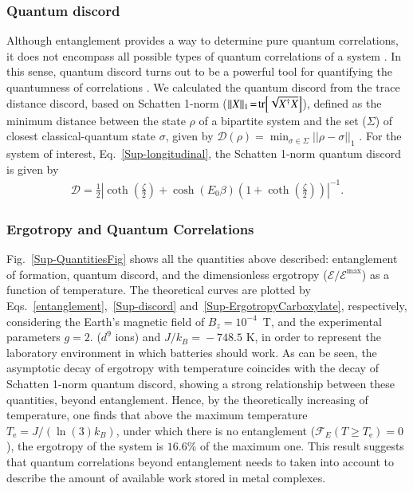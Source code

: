 \documentclass[aps,prl,epsfigure,twocolumn,superscriptaddress]{revtex4-1}
\newcommand{\Dcal}{\mathcal{D}}
\newcommand{\Ecal}{\mathcal{E}}
\newcommand{\Fcal}{\mathcal{F}}
\newcommand{\1}{\mathbbm{1}}
\begin{document}
\subsubsection{Quantum discord}

Although entanglement provides a way to determine pure quantum correlations, it does not encompass all possible types of quantum correlations of a system \cite{cruz,Ciccarello:14,Obando:15,yurishchev2011quantum}. In this sense, quantum discord turns out to be a powerful tool for quantifying the quantumness of correlations \cite{Zurek:01}. We calculated the quantum discord from the trace distance discord, based on Schatten 1-norm ($||X||_{1}\!=\!\tr[\sqrt{X^{\dagger}X}]$), defined as the minimum distance between the state $\rho$ of a bipartite system and the set ($\Sigma$) of closest classical-quantum state $\sigma$, given by $\Dcal(\rho)\!=\!\min_{\sigma \in \Sigma}||\rho - \sigma ||_{1}$ \cite{Ciccarello:14}. For the system of interest, Eq.~\eqref{Sup-longitudinal}, the Schatten 1-norm quantum discord is given by
\begin{align}
\Dcal = \frac{1}{2} \left\vert\coth (\frac{\zeta}{2}) + \cosh (E_{0}\beta) \left( 1 + \coth (\frac{\zeta}{2}) \right)\right\vert^{-1}.
\label{Sup-discord}
\end{align}

\subsubsection{Ergotropy and Quantum Correlations}

Fig.~\ref{Sup-QuantitiesFig} shows all the quantities above described: entanglement of formation, quantum discord, and the dimensionless ergotropy  ($\Ecal/\Ecal^{\text{max}}$) as a function of temperature. The theoretical curves are plotted by Eqs.~\eqref{entanglement},~\eqref{Sup-discord} and~\eqref{Sup-ErgotropyCarboxylate}, respectively, considering the Earth's magnetic field of $B_z\!=\!10^{-4}$~T, and the experimental parameters $g=2.$ ($d^{9}$ ions) and $J/k_{B}\!=\!- 748.5$ K, in order to represent the laboratory environment in which batteries should work. As can be seen, the asymptotic decay of ergotropy with temperature coincides with the decay of Schatten 1-norm quantum discord, showing a strong relationship between these quantities, beyond entanglement. Hence, by the theoretically increasing of temperature, one finds that above the maximum  temperature $T_{\text{e}}=J /(\ln (3)k_{B})$, under which there is no entanglement ($\Fcal_{E}(T\!\geq\! T_{\text{e}})\!=\!0$), the ergotropy of the system is $16.6\%$ of the maximum one. This result suggests that quantum correlations beyond entanglement needs to taken into account to describe the amount of available work stored in metal complexes.
\end{document}
